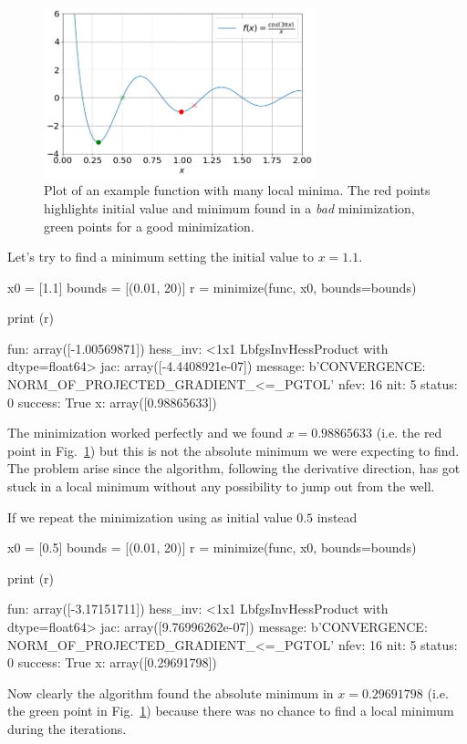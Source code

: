 \begin{figure}[htb]
	\centering
	\includegraphics[width=0.7\textwidth]{figures/local_minima}
	\caption{Plot of an example function with many local minima. The red points highlights initial value and minimum found in a \emph{bad} minimization, green points for a good minimization.}
	\label{fig:local_minima}
\end{figure}
Let's try to find a minimum setting the initial value to $x=1.1$.
\begin{ipython}
x0 = [1.1]
bounds = [(0.01, 20)]
r = minimize(func, x0, bounds=bounds)

print (r)
\end{ipython}
\begin{ioutput}
     fun: array([-1.00569871])
hess_inv: <1x1 LbfgsInvHessProduct with dtype=float64>
     jac: array([-4.4408921e-07])
 message: b'CONVERGENCE: NORM_OF_PROJECTED_GRADIENT_<=_PGTOL'
    nfev: 16
     nit: 5
  status: 0
 success: True
       x: array([0.98865633])
\end{ioutput}
The minimization worked perfectly and we found $x=0.98865633$ (i.e. the red point in Fig.~\ref{fig:local_minima}) but this is not the absolute minimum we were expecting to find. The problem arise since the algorithm, following the derivative direction, has got stuck in a local minimum without any possibility to jump out from the well.

If we repeat the minimization using as initial value $0.5$ instead
\begin{ipython}
x0 = [0.5]
bounds = [(0.01, 20)]
r = minimize(func, x0, bounds=bounds)

print (r)
\end{ipython}
\begin{ioutput}
     fun: array([-3.17151711])
hess_inv: <1x1 LbfgsInvHessProduct with dtype=float64>
     jac: array([9.76996262e-07])
 message: b'CONVERGENCE: NORM_OF_PROJECTED_GRADIENT_<=_PGTOL'
    nfev: 16
     nit: 5
  status: 0
 success: True
       x: array([0.29691798])
\end{ioutput}
Now clearly the algorithm found the absolute minimum in $x=0.29691798$ (i.e. the green point in Fig.~\ref{fig:local_minima}) because there was no chance to find a local minimum during the iterations.

